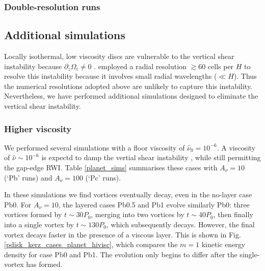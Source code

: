 


\subsubsection{Double-resolution runs}%


\subsection{Additional simulations}%
Locally isothermal, low viscosity discs are vulnerable to the vertical shear 
instability because $\partial_z\Omega_i\neq 0$ \citep{nelson12}. 
\citeauthor{nelson12} employed a radial  resolution $\gtrsim 60$ cells
per $H$ to resolve this instability because it involves small radial
wavelengths ($\ll H$). Thus the numerical resolutions adopted
above are unlikely to capture this instability. Nevertheless, we have
performed additional simulations designed to eliminate the vertical shear
instability.  

\subsubsection{Higher viscosity}
We performed several simulations with a floor
viscosity of $\hat{\nu}_0=10^{-6}$. A viscosity of
$\hat{\nu}\sim 10^{-6}$ is expectd to damp the vertial shear 
instability \citep{nelson12}, while still permitting the gap-edge
RWI. Table \ref{planet_sims} summarises
these cases with $A_\nu=10$ (`Pb' runs) and $A_\nu=100$ (`Pc' runs). 

In these simulations we find vortices eventually decay, even in the
no-layer case Pb0. For $A_\nu=10$, the layered cases Pb0.5 and Pb1 evolve
similarly Pb0: three vortices formed by $t\sim30P_0$, merging into two
vortices by $t\sim40P_0$, then finally into a single vortex by
$t\sim130P_0$, which subsequently decays. However, the final vortex
decays faster in the presence of a viscous layer. This is shown in
Fig. \ref{pdisk_kerz_cases_planet_hivisc}, which compares the $m=1$
kinetic energy density for case Pb0 and Pb1. The evolution only begins
to differ after the single-vortex has formed. 

